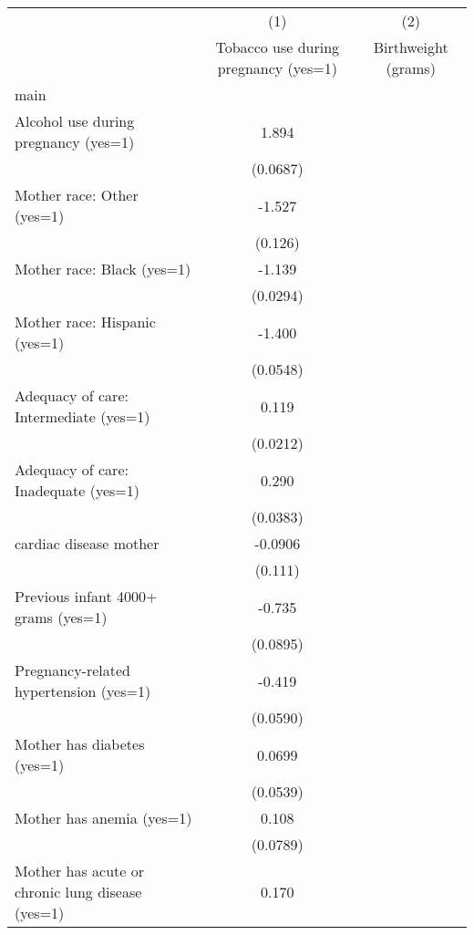 \begin{tabular}{l*{2}{c}}
\hline\hline
                    &\multicolumn{1}{c}{(1)}&\multicolumn{1}{c}{(2)}\\
                    &\multicolumn{1}{c}{Tobacco use during pregnancy (yes=1)}&\multicolumn{1}{c}{Birthweight (grams)}\\
\hline
main                &            &            \\
Alcohol use during pregnancy (yes=1)&       1.894&            \\
                    &    (0.0687)&            \\
[1em]
Mother race: Other (yes=1)&      -1.527&            \\
                    &     (0.126)&            \\
[1em]
Mother race: Black (yes=1)&      -1.139&            \\
                    &    (0.0294)&            \\
[1em]
Mother race: Hispanic (yes=1)&      -1.400&            \\
                    &    (0.0548)&            \\
[1em]
Adequacy of care: Intermediate (yes=1)&       0.119&            \\
                    &    (0.0212)&            \\
[1em]
Adequacy of care: Inadequate (yes=1)&       0.290&            \\
                    &    (0.0383)&            \\
[1em]
cardiac disease mother&     -0.0906&            \\
                    &     (0.111)&            \\
[1em]
Previous infant 4000+ grams (yes=1)&      -0.735&            \\
                    &    (0.0895)&            \\
[1em]
Pregnancy-related hypertension (yes=1)&      -0.419&            \\
                    &    (0.0590)&            \\
[1em]
Mother has diabetes (yes=1)&      0.0699&            \\
                    &    (0.0539)&            \\
[1em]
Mother has anemia (yes=1)&       0.108&            \\
                    &    (0.0789)&            \\
[1em]
Mother has acute or chronic lung disease (yes=1)&       0.170&            \\

\end{tabular}
